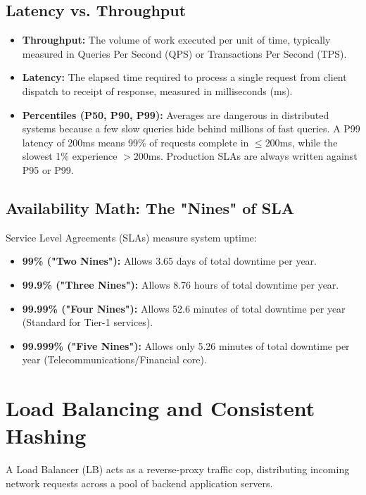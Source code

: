 \documentclass[10pt,journal,compsoc,onecolumn]{IEEEtran}
\begin{document}
\subsection{Latency vs. Throughput}
\begin{itemize}
    \item \textbf{Throughput:} The volume of work executed per unit of time, typically measured in Queries Per Second (QPS) or Transactions Per Second (TPS).
    \item \textbf{Latency:} The elapsed time required to process a single request from client dispatch to receipt of response, measured in milliseconds (ms).
    \item \textbf{Percentiles (P50, P90, P99):} Averages are dangerous in distributed systems because a few slow queries hide behind millions of fast queries. A P99 latency of 200ms means 99\% of requests complete in $\le 200$ms, while the slowest 1\% experience $> 200$ms. Production SLAs are always written against P95 or P99.
\end{itemize}

\subsection{Availability Math: The "Nines" of SLA}
Service Level Agreements (SLAs) measure system uptime:
\begin{itemize}
    \item \textbf{99\% ("Two Nines"):} Allows 3.65 days of total downtime per year.
    \item \textbf{99.9\% ("Three Nines"):} Allows 8.76 hours of total downtime per year.
    \item \textbf{99.99\% ("Four Nines"):} Allows 52.6 minutes of total downtime per year (Standard for Tier-1 services).
    \item \textbf{99.999\% ("Five Nines"):} Allows only 5.26 minutes of total downtime per year (Telecommunications/Financial core).
\end{itemize}

\section{Load Balancing and Consistent Hashing}
\label{sec:lb_hashing}

A Load Balancer (LB) acts as a reverse-proxy traffic cop, distributing incoming network requests across a pool of backend application servers.
\end{document}
